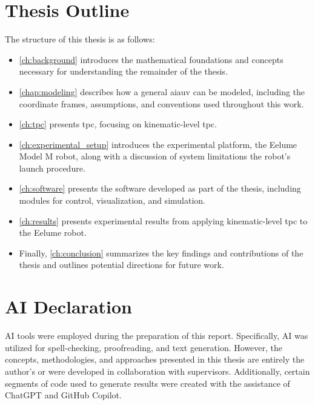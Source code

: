 
\newpage
\section{Thesis Outline}

The structure of this thesis is as follows:

\begin{itemize}
    \item \autoref{ch:background} introduces the mathematical foundations and concepts necessary for understanding the remainder of the thesis.
    \item \autoref{chap:modeling} describes how a general \gls{aiauv} can be modeled, including the coordinate frames, assumptions, and conventions used throughout this work. 
    \item \autoref{ch:tpc} presents \gls{tpc}, focusing on kinematic-level \gls{tpc}.
    \item \autoref{ch:experimental_setup} introduces the experimental platform, the Eelume Model M robot, along with a discussion of system limitations the robot's launch procedure.
    \item \autoref{ch:software} presents the software developed as part of the thesis, including modules for control, visualization, and simulation.
    \item \autoref{ch:results} presents experimental results from applying kinematic-level \gls{tpc} to the Eelume robot.
    \item Finally, \autoref{ch:conclusion} summarizes the key findings and contributions of the thesis and outlines potential directions for future work.
\end{itemize}

\newpage
\section{AI Declaration}
AI tools were employed during the preparation of this report. Specifically, AI was utilized for spell-checking, proofreading, and text generation. However, the concepts, methodologies, and approaches presented in this thesis are entirely the author's or were developed in collaboration with supervisors. Additionally, certain segments of code used to generate results were created with the assistance of ChatGPT and GitHub Copilot.
